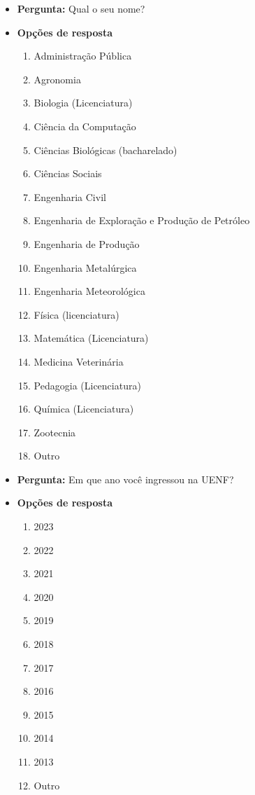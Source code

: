 \begin{apendicesenv}
  \begin{itemize}
    \item \textbf{Pergunta:} Qual o seu nome?
    \item \textbf{Opções de resposta}
          \begin{enumerate}
            \item Administração Pública
            \item Agronomia
            \item Biologia (Licenciatura)
            \item Ciência da Computação
            \item Ciências Biológicas (bacharelado)
            \item Ciências Sociais
            \item Engenharia Civil
            \item Engenharia de Exploração e Produção de Petróleo
            \item Engenharia de Produção
            \item Engenharia Metalúrgica
            \item Engenharia Meteorológica
            \item Física (licenciatura)
            \item Matemática (Licenciatura)
            \item Medicina Veterinária
            \item Pedagogia (Licenciatura)
            \item Química (Licenciatura)
            \item Zootecnia
            \item Outro
          \end{enumerate}
  \end{itemize}

  \begin{itemize}
    \item \textbf{Pergunta:} Em que ano você ingressou na UENF?
    \item \textbf{Opções de resposta}
          \begin{enumerate}
            \item 2023
            \item 2022
            \item 2021
            \item 2020
            \item 2019
            \item 2018
            \item 2017
            \item 2016
            \item 2015
            \item 2014
            \item 2013
            \item Outro
          \end{enumerate}
  \end{itemize}


\end{apendicesenv}
